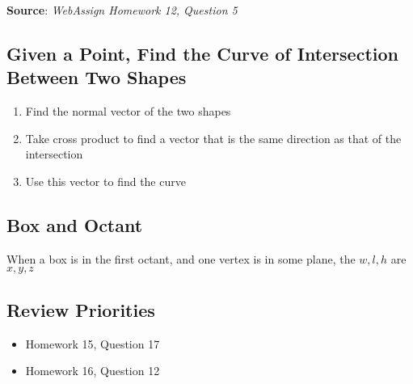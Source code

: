     \textbf{Source}: \textit{WebAssign Homework 12, Question 5}

  \subsection{Given a Point, Find the Curve of Intersection Between Two Shapes}

    \begin{enumerate}
      \item Find the normal vector of the two shapes
      \item Take cross product to find a vector that is the same direction
      as that of the intersection
      \item Use this vector to find the curve
    \end{enumerate}

  \subsection{Box and Octant}

    When a box is in the first octant, and one vertex is in
    some plane, the $ w, l, h $ are $ x, y, z $

  \subsection{Review Priorities}

    \begin{itemize}
      \item Homework 15, Question 17
      \item Homework 16, Question 12
    \end{itemize}